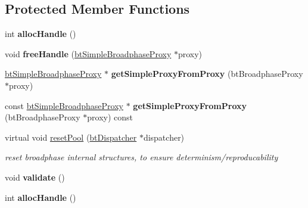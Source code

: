 \subsection*{Protected Member Functions}
\begin{DoxyCompactItemize}
\item 
\mbox{\label{classbtSimpleBroadphase_a8d01b4c49e93f64469f20dab03109454}} 
int {\bfseries alloc\+Handle} ()
\item 
\mbox{\label{classbtSimpleBroadphase_a3a5bbfbcb61d3236acc05da1e59dfee6}} 
void {\bfseries free\+Handle} (\hyperlink{structbtSimpleBroadphaseProxy}{bt\+Simple\+Broadphase\+Proxy} $\ast$proxy)
\item 
\mbox{\label{classbtSimpleBroadphase_a1dd4dc9f2796655cf967d7bb9251bd2f}} 
\hyperlink{structbtSimpleBroadphaseProxy}{bt\+Simple\+Broadphase\+Proxy} $\ast$ {\bfseries get\+Simple\+Proxy\+From\+Proxy} (bt\+Broadphase\+Proxy $\ast$proxy)
\item 
\mbox{\label{classbtSimpleBroadphase_a00efad7fee17c1efebc3d8eb1a09a3ec}} 
const \hyperlink{structbtSimpleBroadphaseProxy}{bt\+Simple\+Broadphase\+Proxy} $\ast$ {\bfseries get\+Simple\+Proxy\+From\+Proxy} (bt\+Broadphase\+Proxy $\ast$proxy) const
\item 
\mbox{\label{classbtSimpleBroadphase_a65c387ba0fa8690716296ee9d5f7550a}} 
virtual void \hyperlink{classbtSimpleBroadphase_a65c387ba0fa8690716296ee9d5f7550a}{reset\+Pool} (\hyperlink{classbtDispatcher}{bt\+Dispatcher} $\ast$dispatcher)
\begin{DoxyCompactList}\small\item\em reset broadphase internal structures, to ensure determinism/reproducability \end{DoxyCompactList}\item 
\mbox{\label{classbtSimpleBroadphase_af866dab98556727f621a3e257ed8ff8f}} 
void {\bfseries validate} ()
\item 
\mbox{\label{classbtSimpleBroadphase_a8d01b4c49e93f64469f20dab03109454}} 
int {\bfseries alloc\+Handle} ()
\item 

\end{DoxyCompactItemize}
